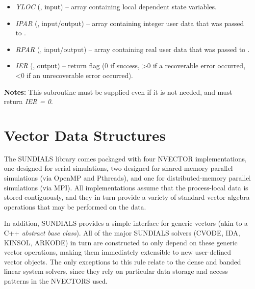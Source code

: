 \documentclass[letterpaper,10pt,english]{sphinxmanual}
\begin{document}
\begin{enumerate}
\begin{fulllineitems}
\begin{description}
\begin{itemize}
\item {} 
\emph{YLOC} (, input) -- array containing local
dependent state variables.

\item {} 
\emph{IPAR} (, input/output) -- array containing
integer user data that was passed to
{\hyperref[f_interface/Usage:f/_/FARKMALLOC]{}}.

\item {} 
\emph{RPAR} (, input/output) -- array containing
real user data that was passed to {\hyperref[f_interface/Usage:f/_/FARKMALLOC]{}}.

\item {} 
\emph{IER} (, output) -- return flag (0 if success, \textgreater{}0
if a recoverable error occurred, \textless{}0 if an unrecoverable
error occurred).

\end{itemize}

\end{description}

\textbf{Notes:}
This subroutine must be supplied even if it is not needed, and
must return \emph{IER = 0}.

\end{fulllineitems}


\end{enumerate}


\chapter{Vector Data Structures}
\label{nvectors/index:nvectors}\label{nvectors/index::doc}\label{nvectors/index:vector-data-structures}
The SUNDIALS library comes packaged with four NVECTOR implementations,
one designed for serial simulations, two designed for shared-memory
parallel simulations (via OpenMP and Pthreads), and one for
distributed-memory parallel simulations (via MPI).  All
implementations assume that the process-local data is stored
contiguously, and they in turn provide a variety of standard vector
algebra operations that may be performed on the data.

In addition, SUNDIALS provides a simple interface for generic vectors
(akin to a C++ \emph{abstract base class}).  All of the major SUNDIALS
solvers (CVODE, IDA, KINSOL, ARKODE) in turn are constructed to only
depend on these generic vector operations, making them immediately
extensible to new user-defined vector objects.  The only exceptions to
this rule relate to the dense and banded linear system solvers, since
they rely on particular data storage and access patterns in the
NVECTORS used.
\end{document}
